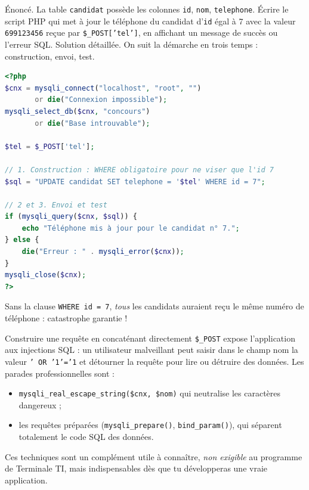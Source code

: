 \documentclass[11pt]{article}
\newcommand{\cle}[1]{{\popxbold\color{popdark}#1}}
\begin{document}
\begin{exoresolu}
Énoncé. La table \texttt{candidat} possède les colonnes \texttt{id}, \texttt{nom}, \texttt{telephone}. Écrire le script PHP qui met à jour le téléphone du candidat d'\texttt{id} égal à 7 avec la valeur \texttt{699123456} reçue par \texttt{\$\_POST['tel']}, en affichant un message de succès ou l'erreur SQL.
\tcblower
Solution détaillée. On suit la démarche en trois temps : construction, envoi, test.
\begin{lstlisting}[language=Php]
<?php
$cnx = mysqli_connect("localhost", "root", "")
       or die("Connexion impossible");
mysqli_select_db($cnx, "concours") 
       or die("Base introuvable");

$tel = $_POST['tel'];

// 1. Construction : WHERE obligatoire pour ne viser que l'id 7
$sql = "UPDATE candidat SET telephone = '$tel' WHERE id = 7";

// 2 et 3. Envoi et test
if (mysqli_query($cnx, $sql)) {
    echo "Téléphone mis à jour pour le candidat n° 7.";
} else {
    die("Erreur : " . mysqli_error($cnx));
}
mysqli_close($cnx);
?>
\end{lstlisting}
Sans la clause \texttt{WHERE id = 7}, \emph{tous} les candidats auraient reçu le même numéro de téléphone : catastrophe garantie !
\end{exoresolu}

\begin{attention}
Construire une requête en concaténant directement \texttt{\$\_POST} expose l'application aux \cle{injections SQL} : un utilisateur malveillant peut saisir dans le champ nom la valeur \texttt{' OR '1'='1} et détourner la requête pour lire ou détruire des données. Les parades professionnelles sont :
\begin{itemize}
  \item \texttt{mysqli\_real\_escape\_string(\$cnx, \$nom)} qui neutralise les caractères dangereux ;
  \item les \cle{requêtes préparées} (\texttt{mysqli\_prepare()}, \texttt{bind\_param()}), qui séparent totalement le code SQL des données.
\end{itemize}
Ces techniques sont un complément utile à connaître, \emph{non exigible} au programme de Terminale TI, mais indispensables dès que tu développeras une vraie application.
\end{attention}
\end{document}
